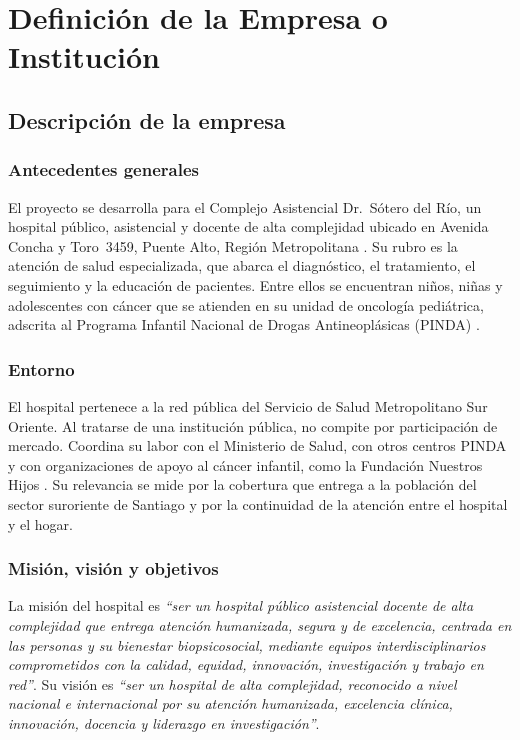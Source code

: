 \chapter[Definición de la Empresa o Institución]{Definición de la Empresa o Institución}

\section[Descripción de la Empresa]{Descripción de la empresa}

\subsection*{Antecedentes generales}

El proyecto se desarrolla para el Complejo Asistencial Dr.~Sótero del Río, un
hospital público, asistencial y docente de alta complejidad ubicado en Avenida
Concha y Toro~3459, Puente Alto, Región Metropolitana \citep{hospital_sotero_2026}.
Su rubro es la atención de salud especializada, que abarca el diagnóstico, el
tratamiento, el seguimiento y la educación de pacientes. Entre ellos se
encuentran niños, niñas y adolescentes con cáncer que se atienden en su unidad de
oncología pediátrica, adscrita al Programa Infantil Nacional de Drogas
Antineoplásicas (PINDA) \citep{pinda_centros_2026}.

\subsection*{Entorno}

El hospital pertenece a la red pública del Servicio de Salud Metropolitano Sur
Oriente. Al tratarse de una institución pública, no compite por participación de
mercado. Coordina su labor con el Ministerio de Salud, con otros centros PINDA y
con organizaciones de apoyo al cáncer infantil, como la Fundación Nuestros Hijos
\citep{fundacion_nuestros_hijos_2026}. Su relevancia se mide por la cobertura que
entrega a la población del sector suroriente de Santiago y por la continuidad de
la atención entre el hospital y el hogar.

\subsection*{Misión, visión y objetivos}

La misión del hospital es \emph{``ser un hospital público asistencial docente de
alta complejidad que entrega atención humanizada, segura y de excelencia,
centrada en las personas y su bienestar biopsicosocial, mediante equipos
interdisciplinarios comprometidos con la calidad, equidad, innovación,
investigación y trabajo en red''}. Su visión es \emph{``ser un hospital de alta
complejidad, reconocido a nivel nacional e internacional por su atención
humanizada, excelencia clínica, innovación, docencia y liderazgo en
investigación''}.

